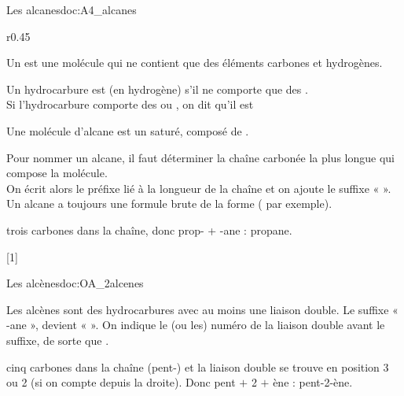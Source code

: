 \begin{doc}{Les alcanes}{doc:A4_alcanes}
  \begin{wrapfigure}{r}{0.45\linewidth}   
    \vspace*{-30pt}
    \begin{boite}
      \begin{importants}
        Un  est une molécule qui ne contient que des éléments carbones et hydrogènes.
      \end{importants}
      \begin{importants}
        Un hydrocarbure est  (en hydrogène) s'il ne comporte que des . \\
        Si l'hydrocarbure comporte des  ou , on dit qu'il est 
      \end{importants}
    \end{boite}
  \end{wrapfigure}
  \phantom{b}\vspace*{-14pt}
  
  \begin{importants}
    Une molécule d'alcane est un  saturé, composé de .
  \end{importants}
  Pour nommer un alcane, il faut déterminer la chaîne carbonée la plus longue qui compose la molécule. \\
  On écrit alors le préfixe lié à la longueur de la chaîne et on ajoute le suffixe «  ». \\
  Un alcane a toujours une formule brute de la forme  ( par exemple).
  
  \vspace*{4pt}
  \exemple {} trois carbones dans la chaîne, donc prop- + -ane : propane.
\end{doc}

[1]


\begin{doc}{Les alcènes}{doc:OA_2alcenes}
  \begin{importants}
    Les alcènes sont des hydrocarbures avec au moins une liaison double.
    Le suffixe « -ane », devient «  ».
    On indique le (ou les) numéro de la liaison double avant le suffixe, de sorte que .
  \end{importants}
  \exemple {} cinq carbones dans la chaîne (pent-) et la liaison double se trouve en position 3 ou 2 (si on compte depuis la droite).
  Donc pent $+$ 2 $+$ ène : pent-2-ène.
\end{doc}

